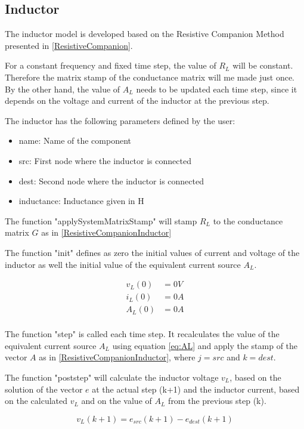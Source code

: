 \subsection{Inductor}

The inductor model is developed based on the Resistive Companion Method presented in \ref{ResistiveCompanion}.

For a constant frequency and fixed time step, the value of $R_L$ will be constant. Therefore the matrix stamp of the conductance matrix will me made just once. By the other hand, the value of $A_L$ needs to be updated each time step, since it depends on the voltage and current of the inductor at the previous step.

The inductor has the following parameters defined by the user:

\begin{itemize}
\item name: Name of the component
\item src: First node where the inductor is connected
\item dest: Second node where the inductor is connected
\item inductance: Inductance given in H
\end{itemize}

The function "applySystemMatrixStamp" will stamp $R_L$ to the conductance matrix $G$ as in \ref{ResistiveCompanionInductor}

The function "init" defines as zero the initial values of current and voltage of the inductor as well the initial value of the equivalent current source $A_L$.

\begin{align*}
v_L(0)&=0V \\
i_L(0)&=0A \\
A_L(0)&=0A \\
\end{align*}

The function "step" is called each time step. It recalculates the value of the equivalent current source $A_L$ using equation \ref{eq:AL} and apply the stamp of the vector $A$ as in \ref{ResistiveCompanionInductor}, where $j=src$ and $k=dest$.

The function "poststep" will calculate the inductor voltage $v_L$, based on the solution of the vector $e$ at the actual step (k+1) and the inductor current, based on the calculated $v_L$ and on the value of $A_L$ from the previous step (k).

\begin{equation} \label{eq:inductorVoltage}
v_L(k+1) = e_{src}(k+1) - e_{dest}(k+1)
\end{equation}

